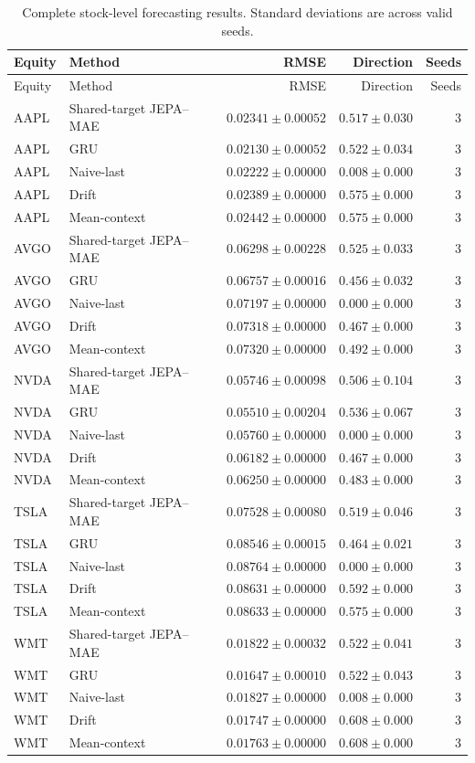 \begin{longtable}{llrrr}
\caption{Complete stock-level forecasting results. Standard deviations are across valid seeds.}\label{tab:appendix_stock_metrics}\\
\toprule
Equity & Method & RMSE & Direction & Seeds \\
\midrule
\endfirsthead
\toprule
Equity & Method & RMSE & Direction & Seeds \\
\midrule
\endhead
AAPL & Shared-target JEPA--MAE & $0.02341 \pm 0.00052$ & $0.517 \pm 0.030$ & 3 \\
AAPL & GRU & $0.02130 \pm 0.00052$ & $0.522 \pm 0.034$ & 3 \\
AAPL & Naive-last & $0.02222 \pm 0.00000$ & $0.008 \pm 0.000$ & 3 \\
AAPL & Drift & $0.02389 \pm 0.00000$ & $0.575 \pm 0.000$ & 3 \\
AAPL & Mean-context & $0.02442 \pm 0.00000$ & $0.575 \pm 0.000$ & 3 \\
AVGO & Shared-target JEPA--MAE & $0.06298 \pm 0.00228$ & $0.525 \pm 0.033$ & 3 \\
AVGO & GRU & $0.06757 \pm 0.00016$ & $0.456 \pm 0.032$ & 3 \\
AVGO & Naive-last & $0.07197 \pm 0.00000$ & $0.000 \pm 0.000$ & 3 \\
AVGO & Drift & $0.07318 \pm 0.00000$ & $0.467 \pm 0.000$ & 3 \\
AVGO & Mean-context & $0.07320 \pm 0.00000$ & $0.492 \pm 0.000$ & 3 \\
NVDA & Shared-target JEPA--MAE & $0.05746 \pm 0.00098$ & $0.506 \pm 0.104$ & 3 \\
NVDA & GRU & $0.05510 \pm 0.00204$ & $0.536 \pm 0.067$ & 3 \\
NVDA & Naive-last & $0.05760 \pm 0.00000$ & $0.000 \pm 0.000$ & 3 \\
NVDA & Drift & $0.06182 \pm 0.00000$ & $0.467 \pm 0.000$ & 3 \\
NVDA & Mean-context & $0.06250 \pm 0.00000$ & $0.483 \pm 0.000$ & 3 \\
TSLA & Shared-target JEPA--MAE & $0.07528 \pm 0.00080$ & $0.519 \pm 0.046$ & 3 \\
TSLA & GRU & $0.08546 \pm 0.00015$ & $0.464 \pm 0.021$ & 3 \\
TSLA & Naive-last & $0.08764 \pm 0.00000$ & $0.000 \pm 0.000$ & 3 \\
TSLA & Drift & $0.08631 \pm 0.00000$ & $0.592 \pm 0.000$ & 3 \\
TSLA & Mean-context & $0.08633 \pm 0.00000$ & $0.575 \pm 0.000$ & 3 \\
WMT & Shared-target JEPA--MAE & $0.01822 \pm 0.00032$ & $0.522 \pm 0.041$ & 3 \\
WMT & GRU & $0.01647 \pm 0.00010$ & $0.522 \pm 0.043$ & 3 \\
WMT & Naive-last & $0.01827 \pm 0.00000$ & $0.008 \pm 0.000$ & 3 \\
WMT & Drift & $0.01747 \pm 0.00000$ & $0.608 \pm 0.000$ & 3 \\
WMT & Mean-context & $0.01763 \pm 0.00000$ & $0.608 \pm 0.000$ & 3 \\
\bottomrule
\end{longtable}
